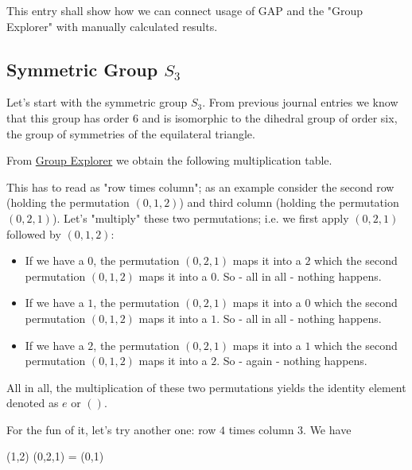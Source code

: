 
This entry shall show how we can connect usage of GAP and the "Group Explorer" with manually calculated results.

\subsection{Symmetric Group $S_3$}

Let's start with the symmetric group $S_3$. From previous journal entries we know that this group has order $6$ and is isomorphic to the dihedral group of order six, the group of symmetries of the equilateral triangle.

From \href{https://nathancarter.github.io/group-explorer/GroupInfo.html?groupURL=https://nathancarter.github.io/group-explorer/groups/S_3.group}{Group Explorer} we obtain the following multiplication table.

    
This has to read as "row times column"; as an example consider the second row (holding the permutation $(0,1,2)$) and third column (holding the permutation $(0,2,1)$). Let's "multiply" these two permutations; i.e. we first apply $(0,2,1)$ followed by $(0,1,2)$:

\begin{itemize}
    \item If we have a $0$, the permutation $(0,2,1)$ maps it into a $2$ which the second permutation $(0,1,2)$ maps it into a $0$. So - all in all - nothing happens.
    \item If we have a $1$, the permutation $(0,2,1)$ maps it into a $0$ which the second permutation $(0,1,2)$ maps it into a $1$. So - all in all - nothing happens.
    \item If we have a $2$, the permutation $(0,2,1)$ maps it into a $1$ which the second permutation $(0,1,2)$ maps it into a $2$. So - again - nothing happens.
\end{itemize}

All in all, the multiplication of these two permutations yields the identity element denoted as $e$ or $()$.

For the fun of it, let's try another one: row $4$ times column $3$. We have

\bee
(1,2) (0,2,1) = (0,1)
\eee

